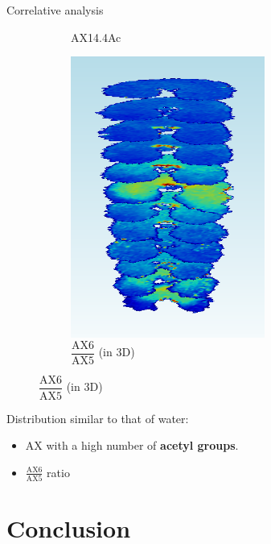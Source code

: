 \documentclass[10pt]{beamer}
\begin{document}
\begin{frame}{Correlative analysis}
\begin{figure}[ht]
\begin{subfigure}[t]{0.33\textwidth}
      \caption{AX14.4Ac}
      \label{subfig:zonetir_0}
    \end{subfigure}%
    \begin{subfigure}[t]{0.33\textwidth}
      \centering
      \includegraphics[width=0.7\textwidth]{fig/3D_250DJ}
      \caption{$\dfrac{\text{AX6}}{\text{AX5}}$ (in 3D)}
      \label{subfig:3D_250DJ}
    \end{subfigure}%

  \end{figure}

  Distribution similar to that of water:
  \begin{itemize}
  \item AX with a high number of \textbf{acetyl groups}.
  \item $\frac{\text{AX6}}{\text{AX5}}$ ratio
  \end{itemize}


\end{frame}



\section{Conclusion}
\end{document}
